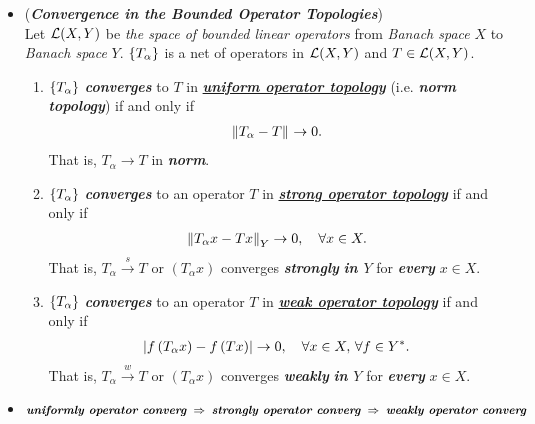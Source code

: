 \documentclass[11pt]{article}
\begin{document}
\begin{itemize}
\item \begin{remark} (\emph{\textbf{Convergence in the Bounded Operator Topologies}})\\
Let ${\mathcal L}(X, Y)$ be \emph{the space of bounded linear operators} from \emph{Banach space} $X$ to \emph{Banach space} $Y$. $\left\{T_{\alpha}\right\}$ is a net of operators in ${\mathcal L}(X, Y)$ and $T \in {\mathcal L}(X, Y)$.
\begin{enumerate}
\item  $\left\{T_{\alpha}\right\}$ \emph{\textbf{converges}}  to $T$ in \underline{\emph{\textbf{uniform operator topology}}} (i.e. \emph{\textbf{norm topology}}) if and only if 
\begin{align*}
\left\|T_{\alpha} - T\right\|_{} \rightarrow 0.
\end{align*} That is, $T_{\alpha} \rightarrow T$ in \emph{\textbf{norm}}.

\item $\left\{T_{\alpha}\right\}$ \emph{\textbf{converges}} to an operator $T$ in \underline{\emph{\textbf{strong operator topology}}} if and only if 
\begin{align*}
\left\|T_{\alpha}x - Tx\right\|_{Y} \rightarrow 0, \quad \forall x \in X.
\end{align*} That is, $T_{\alpha} \stackrel{s}{\rightarrow} T $ or $(T_{\alpha}x)$ converges \emph{\textbf{strongly}} \emph{\textbf{in $Y$}} for \emph{\textbf{every}} $x \in X$.

\item $\left\{T_{\alpha}\right\}$ \emph{\textbf{converges}} to an operator $T$ in \underline{\emph{\textbf{weak operator topology}}} if and only if 
\begin{align*}
\left\lvert f\left(T_{\alpha}x\right) - f\left(Tx\right) \right\rvert\rightarrow 0, \quad \forall x \in X, \, \forall f \in Y^{*}.
\end{align*} That is, $T_{\alpha} \stackrel{w}{\rightarrow} T $ or $(T_{\alpha}x)$ converges \emph{\textbf{weakly}} \emph{\textbf{in $Y$}} for \emph{\textbf{every}} $x \in X$.
\end{enumerate}
\end{remark}

\item \begin{remark}
\begin{align*}
\text{\textbf{\emph{uniformly operator converg}}} \; \Rightarrow \; \text{\textbf{\emph{strongly operator converg}}} \; \Rightarrow \; \text{\textbf{\emph{weakly operator converg}}}
\end{align*}
\end{remark}


\end{itemize}
\end{document}
